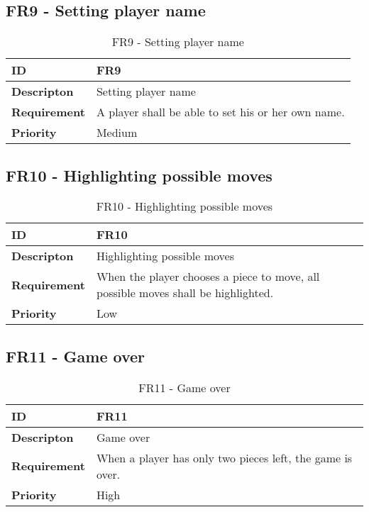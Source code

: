 \subsection{FR9 - Setting player name}

\begin{table}[h!]
\begin{tabular}{ | p{90pt} | p{270pt}  |}
\hline
\bf ID &  FR9 \\ \hline
\bf Descripton & Setting player name \\ \hline 
\bf Requirement & A player shall be able to set his or her own name.  \\ \hline
\bf Priority & Medium \\ \hline

\end{tabular}
\caption{FR9 - Setting player name}
\end{table}

\subsection{FR10 - Highlighting possible moves}

\begin{table}[h!]
\begin{tabular}{ | p{90pt} | p{270pt}  |}
\hline
\bf ID &  FR10  \\ \hline
\bf Descripton & Highlighting possible moves \\ \hline 
\bf Requirement & When the player chooses a piece to move, all possible moves shall be highlighted.  \\ \hline
\bf Priority & Low \\ \hline

\end{tabular}
\caption{FR10 - Highlighting possible moves}
\end{table}

\subsection{FR11 - Game over}

\begin{table}[h!]
\begin{tabular}{ | p{90pt} | p{270pt}  |}
\hline
\bf ID &  FR11  \\ \hline
\bf Descripton & Game over \\ \hline 
\bf Requirement & When a player has only two pieces left, the game is over.  \\ \hline
\bf Priority & High \\ \hline

\end{tabular}
\caption{FR11 - Game over}
\end{table}

\pagebreak



